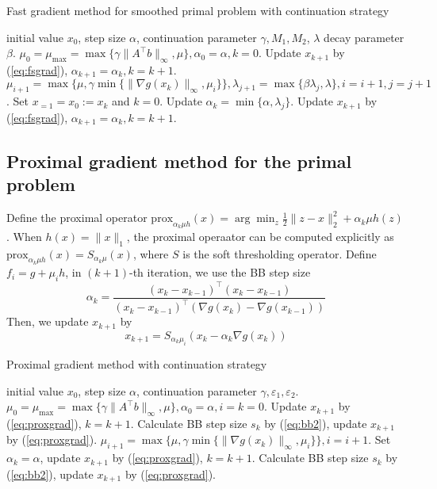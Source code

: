 \documentclass{article}
\numberwithin{equation}{section}
\numberwithin{figure}{section}
\begin{document}
\begin{algorithm}[!htbp]\caption{Fast gradient method for smoothed primal problem with continuation strategy}\label{alg:fsgrad}
\begin{algorithmic}[1]
 initial value $x_0$, step size $\alpha$, continuation parameter $\gamma, M_1, M_2$, $\lambda$ decay parameter $\beta$.
\STATE $\mu_0=\mu_{\max}=\max\{\gamma\|A^\top b\|_\infty,\mu\},\alpha_0=\alpha, k=0$.
\STATE Update $x_{k+1}$ by (\ref{eq:fsgrad}), $\alpha_{k+1}=\alpha_k,k=k+1$.
\ENDFOR
\STATE $\mu_{i+1}=\max\{\mu, \gamma\min\{\|\nabla g(x_k)\|_\infty, \mu_i\} \},  \lambda_{j+1}=\max\{\beta\lambda_j,\lambda\}, i = i+1, j = j+1
$.
\STATE Set $x_{=1} = x_0 := x_k$ and $k=0$. Update $\alpha_k=\min\{\alpha,\lambda_j\}$.
\ENDWHILE
{}
\STATE Update $x_{k+1}$ by (\ref{eq:fsgrad}), $\alpha_{k+1}=\alpha_k,k=k+1$.
\ENDFOR
\end{algorithmic}
\end{algorithm}

\subsection{Proximal gradient method for the primal problem}
Define the proximal operator $\mathrm{prox}_{\alpha_k \mu h}(x)=\arg\min_z \frac{1}{2}\|z-x\|_2^2+\alpha_k \mu h(z)$. When $h(x)=\|x\|_1$, the proximal operaator can be computed explicitly as $\mathrm{prox}_{\alpha_k \mu h}(x)=S_{\alpha_k \mu}(x)$, where $S$ is the soft thresholding operator. Define $f_i=g+\mu_i h$, in $(k+1)$-th iteration, we use the BB step size 
\begin{equation}
    \alpha_k = \frac{(x_k-x_{k-1})^\top (x_k-x_{k-1})}{(x_k-x_{k-1})^\top(\nabla g(x_k)-\nabla g(x_{k-1}))} \label{eq:bb2}
\end{equation}
Then, we update $x_{k+1}$ by
\begin{equation}
    x_{k+1}=S_{\alpha_k \mu_i}(x_k-\alpha_k \nabla g(x_k))\label{eq:proxgrad}
\end{equation}


\begin{algorithm}[!htbp]\caption{Proximal gradient method with continuation strategy}\label{alg:proxgrad}
\begin{algorithmic}[1]
 initial value $x_0$, step size $\alpha$, continuation parameter $\gamma, \varepsilon_1, \varepsilon_2$.
\STATE $\mu_0=\mu_{\max}=\max\{\gamma\|A^\top b\|_\infty,\mu\},\alpha_0=\alpha, i = k=0$.
\STATE Update $x_{k+1}$ by (\ref{eq:proxgrad}), $k = k+1$.
\STATE Calculate BB step size $s_k$ by (\ref{eq:bb2}), update $x_{k+1}$ by (\ref{eq:proxgrad}).
\ENDFOR
\STATE $\mu_{i+1}=\max\{\mu, \gamma\min\{\|\nabla g(x_k)\|_\infty, \mu_i\} \},  i = i+1$.
\STATE Set $\alpha_k = \alpha$, update $x_{k+1}$ by (\ref{eq:proxgrad}), $k=k+1$.
\ENDWHILE
{}
\STATE Calculate BB step size $s_k$ by (\ref{eq:bb2}), update $x_{k+1}$ by (\ref{eq:proxgrad}).
\ENDFOR
\end{algorithmic}
\end{algorithm}
\end{document}
